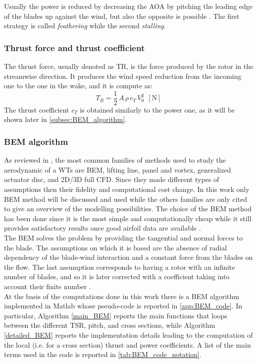 Usually the power is reduced by decreasing the \acrshort{AOA} by pitching the leading edge of the blades up against the wind, but also the opposite is possible \cite{Aerodynamics_of_wind_turbines}. The first strategy is called \textit{feathering} while the second \textit{stalling}.

\subsubsection{Thrust force and thrust coefficient}
The thrust force, usually denoted as \acrshort{TR}, is the force produced by the rotor in the streamwise direction. It produces the wind speed reduction from the incoming one to the one in the wake, and it is compute as:
\begin{equation}
    T_R = \frac{1}{2} \, A \, \rho \, c_T \, V_0^2 \ \ \left[\si{\newton}\right]
    \label{eq:thrust_coeff}
\end{equation}
The thrust coefficient $c_T$ is obtained similarly to the power one, as it will be shown later in \autoref{subsec:BEM_algorithm}.

\subsubsection{BEM algorithm}\label{subsec:BEM_algorithm}
As reviewed in \cite{HANSEN2006285}, the most common families of methods used to study the aerodynamic of a WTs are \acrfull{BEM}, lifting line, panel and vortex, generalized actuator disc, and 2D/3D full CFD. Since they made different types of assumptions then their fidelity and computational cost change. In this work only \acrshort{BEM} method will be discussed and used while the others families are only cited to give an overview of the modelling possibilities. The choice of the BEM method has been done since it is the most simple and computationally cheap while it still provides satisfactory results once good airfoil data are available \cite{HANSEN2006285}.\\
The \acrshort{BEM} solves the problem by providing the tangential and normal forces to the blade. The assumptions on which it is based are the absence of radial dependency of the blade-wind interaction and a constant force from the blades on the flow. The last assumption corresponds to having a rotor with an infinite number of blades, and so it is later corrected with a coefficient taking into account their finite number \cite{Aerodynamics_of_wind_turbines}.\\
At the basis of the computations done in this work there is a \acrshort{BEM} algorithm implemented in Matlab whose pseudo-code is reported in \autoref{app:BEM_code}. In particular, Algorithm \ref{main_BEM} reports the main functions that loops between the different TSR, pitch, and cross sections, while Algorithm \ref{detailed_BEM} reports the implementation details leading to the computation of the local (i.e. for a cross section) thrust and power coefficients. A list of the main terms used in the code is reported in \autoref{tab:BEM_code_notation}.


